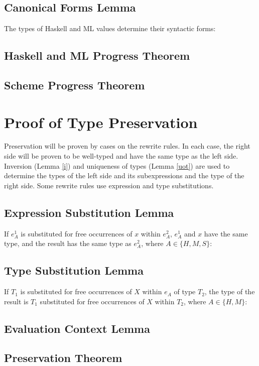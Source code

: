 \subsection{Canonical Forms Lemma}

The types of Haskell and ML values determine their syntactic forms:



\subsection{Haskell and ML Progress Theorem}



\subsection{Scheme Progress Theorem}



\section{Proof of Type Preservation}

Preservation will be proven by cases on the rewrite rules.  In each case, the right side will be proven to be well-typed and have the same type as the left side.  Inversion (Lemma \ref{i}) and uniqueness of types (Lemma \ref{uot}) are used to determine the types of the left side and its subexpressions and the type of the right side.  Some rewrite rules use expression and type substitutions.

\subsection{Expression Substitution Lemma}

If $e_{A}^{1}$ is substituted for free occurrences of $x$ within $e_{A}^{2}$, $e_{A}^{1}$ and $x$ have the same type, and the result has the same type as $e_{A}^{2}$, where $A\in\lbrace H,M,S\rbrace$:



\subsection{Type Substitution Lemma}

If $T_{1}$ is substituted for free occurrences of $X$ within $e_{A}$ of type $T_{2}$, the type of the result is $T_{1}$ substituted for free occurrences of $X$ within $T_{2}$, where $A\in\lbrace H,M\rbrace$:



\subsection{Evaluation Context Lemma}



\subsection{Preservation Theorem}

